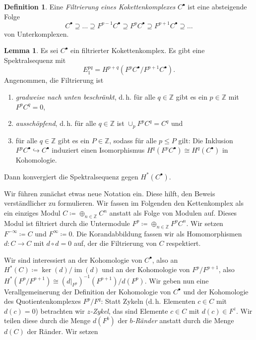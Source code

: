 \documentclass[11pt, a4paper, german]{article}
\theoremstyle{definition}
\newtheorem{lem}{Lemma}
\newtheorem{defn}{Definition}
\theoremstyle{remark}
\newcommand{\Z}{\mathbb{Z}} %
\DeclareMathOperator{\im}{im} %
\newcommand{\ES}{Es sei} %
\renewcommand{\dh}{d.\,h.} %
\begin{document}

\begin{defn}
  Eine \emph{Filtrierung eines Kokettenkomplexes} $C^\bullet$ ist eine absteigende Folge
  \[ C^\bullet \supseteq \ldots \supseteq F^{p-1} C^\bullet \supseteq F^p C^\bullet \supseteq F^{p+1} C^\bullet \supseteq \ldots \]
 von Unterkomplexen.
\end{defn}


\begin{lem}
  \ES{} $C^\bullet$ ein filtrierter Kokettenkomplex.
  Es gibt eine Spektralsequenz mit
  \[ E_1^{pq} = H^{p+q}(F^p C^\bullet / F^{p+1} C^\bullet). \]
  Angenommen, die Filtrierung ist
  \begin{enumerate}[label=\alph*)]
    \item \emph{gradweise nach unten beschränkt}, \dh{} für alle $q \in \Z$ gibt es ein $p \in \Z$ mit $F^p C^q = 0$,
    \item \emph{ausschöpfend}, \dh{} für alle $q \in \Z$ ist $\cup_p F^p C^q = C^q$ und %
    \item für alle $q \in \Z$ gibt es ein $P \in \Z$, sodass für alle $p \leq P$ gilt: Die Inklusion $F^p C^\bullet \hookrightarrow C^\bullet$ induziert einen Isomorphismus $H^q (F^p C^\bullet) \cong H^q(C^\bullet)$ in Kohomologie.
  \end{enumerate}
  Dann konvergiert die Spektralsequenz gegen $H^*(C^\bullet)$.
\end{lem}

Wir führen zunächst etwas neue Notation ein.
Diese hilft, den Beweis verständlicher zu formulieren.
Wir fassen im Folgenden den Kettenkomplex als ein einziges Modul $C \coloneqq \oplus_{n \in \Z} C^n$ anstatt als Folge von Modulen auf.
Dieses Modul ist filtriert durch die Untermodule $F^p \coloneqq \oplus_{n \in \Z} F^p C^n$.
Wir setzen $F^{-\infty} \coloneqq C$ und $F^{\infty} \coloneqq 0$.
Die Korandabbildung fassen wir als Homomorphismen $d : C \to C$ mit $d \circ d = 0$ auf, der die Filtrierung von $C$ respektiert.

Wir sind interessiert an der Kohomologie von $C^\bullet$, also an $H^*(C) \coloneqq \ker(d) / \im(d)$ und an der Kohomologie von $F^p / F^{p+1}$, also $H^*(F^p / F^{p+1}) \cong (d|_{F^p})^{-1}(F^{p+1}) / d(F^p)$.
Wir geben nun eine Verallgemeinerung der Definition der Kohomologie von $C^\bullet$ und der Kohomologie des Quotientenkomplexes $F^p / F^q$: Statt Zykeln (\dh{} Elementen $c \in C$ mit $d(c) = 0$) betrachten wir \emph{$z$-Zykel}, das sind Elemente $c \in C$ mit $d(c) \in F^z$. Wir teilen diese durch die Menge $d(F^b)$ der \emph{$b$-Ränder} anstatt durch die Menge $d(C)$ der Ränder. Wir setzen
\end{document}
